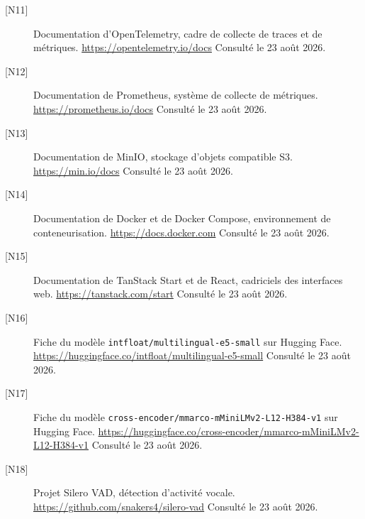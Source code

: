 \begin{description}
\item[{[N11]}] Documentation d'OpenTelemetry, cadre de collecte de traces et de métriques.
\url{https://opentelemetry.io/docs} \newline Consulté le 23 août 2026.

\item[{[N12]}] Documentation de Prometheus, système de collecte de métriques.
\url{https://prometheus.io/docs} \newline Consulté le 23 août 2026.

\item[{[N13]}] Documentation de MinIO, stockage d'objets compatible S3.
\url{https://min.io/docs} \newline Consulté le 23 août 2026.

\item[{[N14]}] Documentation de Docker et de Docker Compose, environnement de conteneurisation.
\url{https://docs.docker.com} \newline Consulté le 23 août 2026.

\item[{[N15]}] Documentation de TanStack Start et de React, cadriciels des interfaces web.
\url{https://tanstack.com/start} \newline Consulté le 23 août 2026.

\item[{[N16]}] Fiche du modèle \texttt{intfloat/multilingual-e5-small} sur Hugging Face.
\url{https://huggingface.co/intfloat/multilingual-e5-small} \newline Consulté le 23 août 2026.

\item[{[N17]}] Fiche du modèle \texttt{cross-encoder/mmarco-mMiniLMv2-L12-H384-v1} sur
Hugging Face. \url{https://huggingface.co/cross-encoder/mmarco-mMiniLMv2-L12-H384-v1}
\newline Consulté le 23 août 2026.

\item[{[N18]}] Projet Silero VAD, détection d'activité vocale.
\url{https://github.com/snakers4/silero-vad} \newline Consulté le 23 août 2026.

\end{description}
